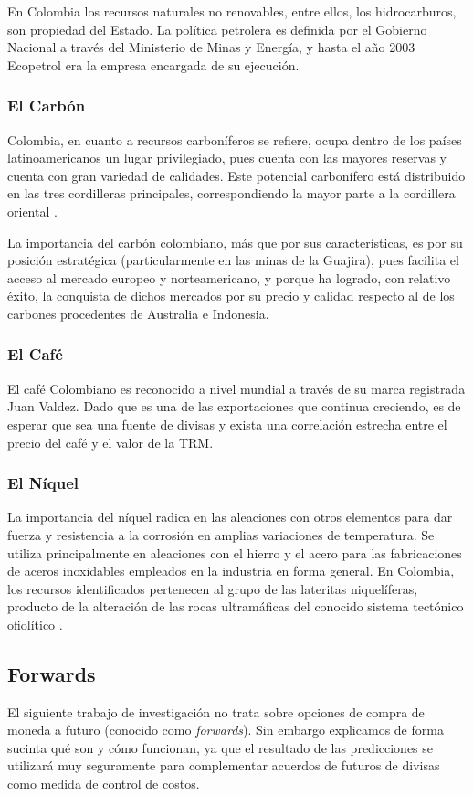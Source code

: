 \documentclass[letterpaper, spanish, 11pt]{report}
\begin{document}
En Colombia los recursos naturales no renovables, entre ellos, los hidrocarburos, son propiedad del Estado. La política petrolera es definida por el Gobierno Nacional a través del Ministerio de Minas y Energía, y hasta el año 2003 Ecopetrol era la empresa encargada de su ejecución. 

\subsubsection{El Carbón}
Colombia, en cuanto a recursos carboníferos se refiere, ocupa dentro de los países latinoamericanos un lugar privilegiado, pues cuenta con las mayores reservas y cuenta con gran variedad de calidades. Este potencial carbonífero está distribuido en las tres cordilleras principales, correspondiendo la mayor parte a la cordillera oriental \cite{cardenas}.

La importancia del carbón colombiano, más que por sus características, es por su posición estratégica (particularmente en las minas de la Guajira), pues facilita el acceso al mercado europeo y norteamericano, y porque ha logrado, con relativo éxito, la conquista de dichos mercados por su precio y calidad respecto al de los carbones procedentes de Australia e Indonesia. 

\subsubsection{El Café}
El café Colombiano es reconocido a nivel mundial a través de su marca registrada Juan Valdez. Dado que es una de las exportaciones que continua creciendo, es de esperar que sea una fuente de divisas y exista una correlación estrecha entre el precio del café y el valor de la TRM.

\subsubsection{El Níquel}
La importancia del níquel radica en las aleaciones con otros elementos para dar fuerza y resistencia a la corrosión en amplias variaciones de temperatura. Se utiliza principalmente en aleaciones con el hierro y el acero para las fabricaciones de aceros inoxidables empleados en la industria en forma general. En Colombia, los recursos identificados pertenecen al grupo de las lateritas niquelíferas, producto de la alteración de las rocas ultramáficas del conocido sistema tectónico ofiolítico \cite{cardenas}.

\subsection{Forwards}
El siguiente trabajo de investigación no trata sobre opciones de compra de moneda a futuro (conocido como \textit{forwards}). Sin embargo explicamos de forma sucinta qué son y cómo funcionan, ya que el resultado de las predicciones se utilizará muy seguramente para complementar acuerdos de futuros de divisas como medida de control de costos.
\end{document}
